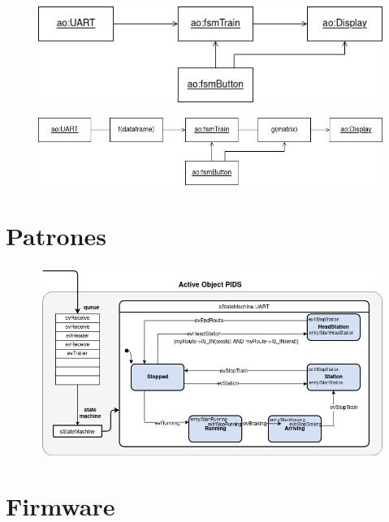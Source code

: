 \begin{figure}[ht]
	\centering
	\includegraphics[width=1\textwidth]{./Figures/diagVistaDisenho.png}
	\caption{}
	\label{fig:diagVistaDisenho}
\end{figure}

\begin{figure}[ht]
	\centering
	\includegraphics[width=1\textwidth]{./Figures/diagVistaDisenhoExtendida.png}
	\caption{}
	\label{fig:diagVistaDisenhoExtendida}
\end{figure}




\pagebreak
\section{Patrones}


\begin{figure}[ht]
	\centering
	\includegraphics[width=1\textwidth]{./Figures/fsmTrain.png}
	\caption{}
	\label{fig:fsmTrain}
\end{figure}

\pagebreak
\section{Firmware}


